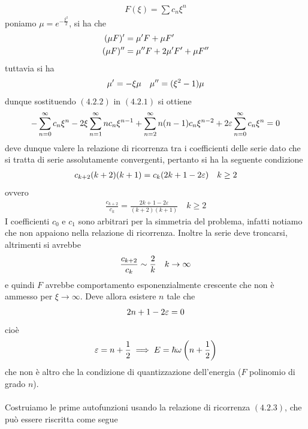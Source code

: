 \documentclass{article}
\begin{document}
\begin{gather}
    F(\xi) = \sum c_n\xi^n \tag{4.2.2}
\end{gather}
poniamo $\mu = e^{-\frac{\xi^2}{2}}$, si ha che
\begin{align}
    (\mu F)' &= \mu'F + \mu F' \notag \\
    (\mu F)'' &= \mu'' F + 2\mu' F' + \mu F'' \notag
\end{align}
tuttavia si ha
\begin{gather}
    \mu ' = -\xi \mu \quad \mu'' = (\xi^2 - 1)\mu \notag
\end{gather}
dunque sostituendo $(4.2.2)$ in $(4.2.1)$ si ottiene
\begin{align}
    -\sum_{n=0}^\infty c_n\xi^n - 2\xi\sum_{n=1}^\infty nc_n\xi^{n-1} + \sum_{n=2}^\infty n(n-1)c_n\xi^{n-2} + 2\varepsilon\sum_{n=0}^\infty c_n\xi^n = 0 \notag
\end{align}
deve dunque valere la relazione di ricorrenza tra i coefficienti delle serie dato che si tratta di serie assolutamente convergenti, pertanto si ha la seguente condizione
\begin{gather}
    c_{k+2}(k+2)(k+1) = c_k(2k+1-2\varepsilon) \quad k \geq 2 \notag
\end{gather}
ovvero
\begin{gather}
    \frac{c_{k+2}}{c_k} = \frac{2k+1-2\varepsilon}{(k+2)(k+1)} \quad k \geq 2 \tag{4.2.3}
\end{gather}
I coefficienti $c_0$ e $c_1$ sono arbitrari per la simmetria del problema, infatti notiamo che non appaiono nella relazione di ricorrenza. Inoltre la serie deve troncarsi, altrimenti si avrebbe
\begin{gather}
    \frac{c_{k+2}}{c_k} \sim \frac{2}{k} \quad k \rightarrow \infty \notag
\end{gather}
e quindi $F$ avrebbe comportamento esponenzialmente crescente che non è ammesso per $\xi \rightarrow \infty$. Deve allora esistere $n$ tale che
\begin{align}
    2n + 1 - 2\varepsilon = 0 \notag
\end{align}
cioè
\begin{gather}
    \varepsilon = n + \frac{1}{2} \implies E = \hbar\omega\left( n + \frac{1}{2} \right) \notag
\end{gather}
che non è altro che la condizione di quantizzazione dell'energia ($F$ polinomio di grado $n$). \\ \\
Costruiamo le prime autofunzioni usando la relazione di ricorrenza $(4.2.3)$, che può essere riscritta come segue
\end{document}
